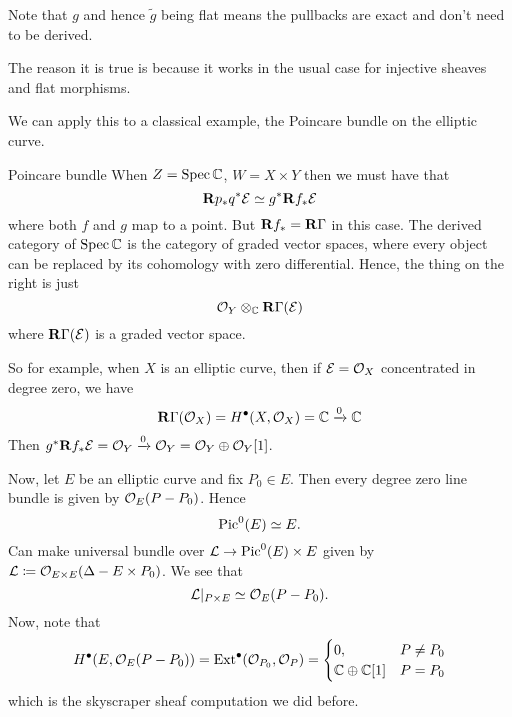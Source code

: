 Note that $g$ and hence $\tilde g$ being flat means the pullbacks are exact and
don't need to be derived.

The reason it is true is because it works in the usual case for injective sheaves and flat morphisms.

We can apply this to a classical example, the Poincare bundle on the elliptic curve.
\begin{example}{Poincare bundle}{}
When $Z=\operatorname{Spec}\mathbb{C}$, $W=X\times Y$ then we must have that
\begin{equation*}
    \mathbf{R} p_*q^*\mathcal{E} \simeq g^*\mathbf{R} f_*\mathcal{E}
\end{equation*}
where both $f$ and $g$ map to a point. But $\mathbf{R} f_*=\operatorname{\mathbf{R}\Gamma}$ in this case. The derived category of $\operatorname{Spec}\mathbb{C}$ is the category of graded vector spaces, where every object can be replaced by its cohomology with zero differential. Hence, the thing on the right is just
\begin{equation*}
    \mathcal{O}_Y\otimes_{\mathbb{C}}\operatorname{\mathbf{R}\Gamma}(\mathcal{E})
\end{equation*}
where $\operatorname{\mathbf{R}\Gamma}(\mathcal{E})$ is a graded vector space.

So for example, when $X$ is an elliptic curve, then if $\mathcal{E}=\mathcal{O}_X$ concentrated in degree zero, we have
\begin{equation*}
    \operatorname{\mathbf{R}\Gamma}(\mathcal{O}_X)=H^\bullet(X,\mathcal{O}_X) = \mathbb{C}\xrightarrow{0}\mathbb{C}
\end{equation*}
Then $g^*\mathbf{R} f_*\mathcal{E} = \mathcal{O}_Y\xrightarrow{0}\mathcal{O}_Y = \mathcal{O}_Y\oplus\mathcal{O}_Y[1]$.

Now, let $E$ be an elliptic curve and fix $P_0\in E$. Then every degree zero line bundle is given by $\mathcal{O}_E(P-P_0)$. Hence
\begin{equation*}
    \operatorname{Pic}^0(E)\simeq E.
\end{equation*}
Can make universal bundle over $\mathcal{L}\to\operatorname{Pic}^0(E)\times E$ given by $\mathcal{L}\coloneqq\mathcal{O}_{E\times E}(\Delta-E\times P_0)$. We see that
\begin{equation*}
    \mathcal{L}|_{P\times E}\simeq \mathcal{O}_E(P-P_0).
\end{equation*}
Now, note that
\begin{equation*}
    H^\bullet(E,\mathcal{O}_E(P-P_0))
        = \operatorname{Ext}^\bullet(\mathcal{O}_{P_0},\mathcal{O}_P)
        = \begin{cases}
            0, & P\neq P_{0} \\
            \mathbb{C}\oplus\mathbb{C}[1] & P=P_{0}
        \end{cases}
\end{equation*}
which is the skyscraper sheaf computation we did before.
\end{example}

